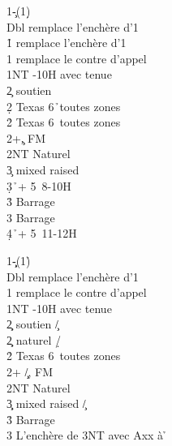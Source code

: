 \documentclass[a4paper]{article}
\begin{document}
\begin{bidtable}
1\c-(1\d)\\
Dbl \> remplace l'enchère d'1\h \\
1\h \> remplace l'enchère d'1\s \\
1\s \> remplace le contre d'appel\\
1NT -10H avec tenue\\
2\c \> soutien \c \\
2\d \> Texas 6\h\ toutes zones\\
2\h \> Texas 6\s\ toutes zones\\
2\s {}+\c , FM\\
2NT \> Naturel\\
3\c \> mixed raised \c \\
3\d {}\h\ + 5\s\ 8-10H\\
3\h \> Barrage \h \\
3\s \> Barrage \s \\
4\d {}\h\ + 5\s\ 11-12H
\end{bidtable}

\begin{bidtable}
1\c\d-(1\h)\\
Dbl \> remplace l'enchère d'1\s \\
1\s \> remplace le contre d'appel\\
1NT -10H avec tenue\\
2\c\d \> soutien \c /\d \\
2\d\c \> naturel \d /\c \\
2\h \> Texas 6\s\ toutes zones\\
2\s {}+ \c /\d , FM\\
2NT \> Naturel\\
3\c\d \> mixed raised \c /\d \\
3\h \> Barrage \s \\
3\s \> L'enchère de 3NT avec Axx à \h 
\end{bidtable}
\end{document}
